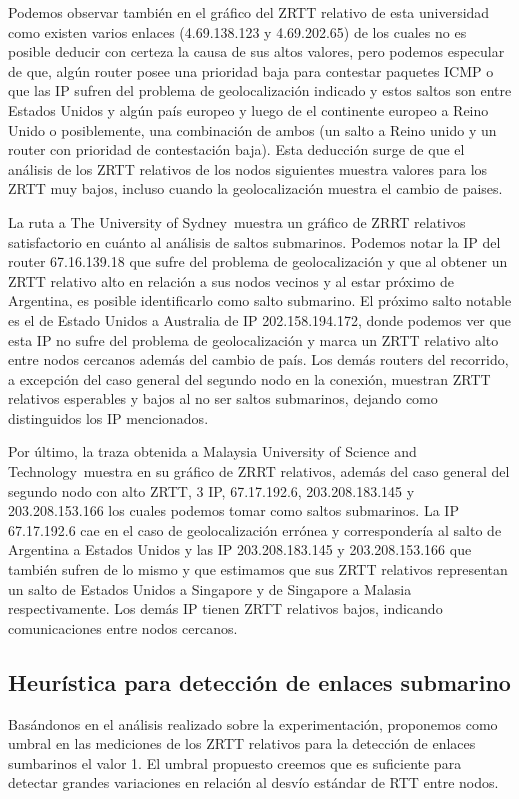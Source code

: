 \documentclass[a4paper, 10pt, twoside]{article}
\newcommand{\sydney}{The University of Sydney}
\newcommand{\must}{Malaysia University of Science and Technology}
\begin{document}
Podemos observar también en el gráfico del ZRTT relativo de esta universidad como existen varios enlaces (4.69.138.123 y 4.69.202.65) de los cuales no es posible deducir con certeza la causa de sus altos valores, pero podemos especular de que, algún router posee una prioridad baja para contestar paquetes ICMP o que las IP sufren del problema de geolocalización indicado y estos saltos son entre Estados Unidos y algún país europeo y luego de el continente europeo a Reino Unido o posiblemente, una combinación de ambos (un salto a Reino unido y un router con prioridad de contestación baja). Esta deducción surge de que el análisis de los ZRTT relativos de los nodos siguientes muestra valores para los ZRTT muy bajos, incluso cuando la geolocalización muestra el cambio de paises.
 
La ruta a \sydney \ muestra un gráfico de ZRRT relativos satisfactorio en cuánto al análisis de saltos submarinos. Podemos notar la IP del router 67.16.139.18 que sufre del problema de geolocalización y que al obtener un ZRTT relativo alto en relación a sus nodos vecinos y al estar próximo de Argentina, es posible identificarlo como salto submarino. El próximo salto notable es el de Estado Unidos a Australia de IP 202.158.194.172, donde podemos ver que esta IP no sufre del problema de geolocalización y marca un ZRTT relativo alto entre nodos cercanos además del cambio de país. Los demás routers del recorrido, a excepción del caso general del segundo nodo en la conexión, muestran ZRTT relativos esperables y bajos al no ser saltos submarinos, dejando como distinguidos los IP mencionados.
 
Por último, la traza obtenida a \must \ muestra en su gráfico de ZRRT relativos, además del caso general del segundo nodo con alto ZRTT, 3 IP, 67.17.192.6, 203.208.183.145 y 203.208.153.166 los cuales podemos tomar como saltos submarinos. La IP 67.17.192.6 cae en el caso de geolocalización errónea y correspondería al salto de Argentina a Estados Unidos y las IP 203.208.183.145 y 203.208.153.166 que también sufren de lo mismo y que estimamos que sus ZRTT relativos representan un salto de Estados Unidos a Singapore y de Singapore a Malasia respectivamente. Los demás IP tienen ZRTT relativos bajos, indicando comunicaciones entre nodos cercanos.

\subsection{Heurística para detección de enlaces submarino}
Basándonos en el análisis realizado sobre la experimentación, proponemos como umbral en las mediciones de los ZRTT relativos para la detección de enlaces sumbarinos el valor 1. El umbral propuesto creemos que es suficiente para detectar grandes variaciones en relación al desvío estándar de RTT entre nodos.
\end{document}
